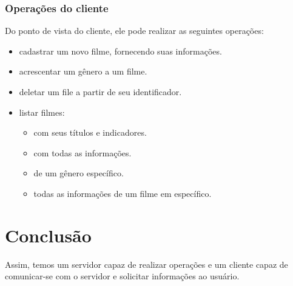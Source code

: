 \documentclass[11pt]{article}
\theoremstyle{definition}
\theoremstyle{definition}
\theoremstyle{remark}
\theoremstyle{remark}
\theoremstyle{remark}
\theoremstyle{remark}
\theoremstyle{definition}
\begin{document}
\subsubsection*{Operações do cliente}
\label{sec:orga7c4a24}
Do ponto de vista do cliente, ele pode realizar as seguintes operações:

\begin{itemize}
\item cadastrar um novo filme, fornecendo suas informações.
\item acrescentar um gênero a um filme.
\item deletar um file a partir de seu identificador.
\item listar filmes:
\begin{itemize}
\item com seus títulos e indicadores.
\item com todas as informações.
\item de um gênero específico.
\item todas as informações de um filme em específico.
\end{itemize}
\end{itemize}

\section*{Conclusão}
\label{sec:org6ca90fe}
Assim, temos um servidor capaz de realizar operações e um cliente capaz de comunicar-se com o servidor e solicitar informações ao usuário.
\end{document}
